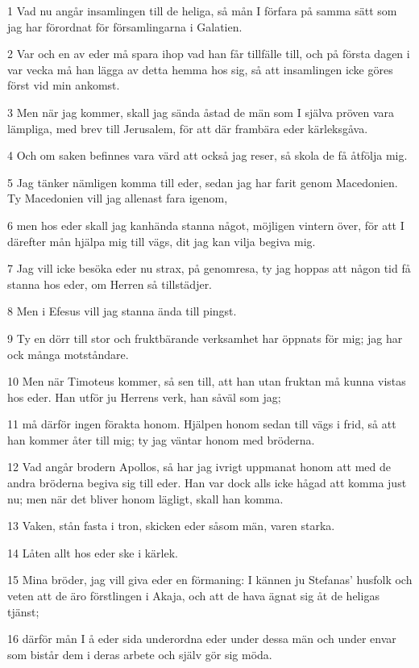 \par 1 Vad nu angår insamlingen till de heliga, så mån I förfara på samma sätt som jag har förordnat för församlingarna i Galatien.
\par 2 Var och en av eder må spara ihop vad han får tillfälle till, och på första dagen i var vecka må han lägga av detta hemma hos sig, så att insamlingen icke göres först vid min ankomst.
\par 3 Men när jag kommer, skall jag sända åstad de män som I själva pröven vara lämpliga, med brev till Jerusalem, för att där frambära eder kärleksgåva.
\par 4 Och om saken befinnes vara värd att också jag reser, så skola de få åtfölja mig.
\par 5 Jag tänker nämligen komma till eder, sedan jag har farit genom Macedonien. Ty Macedonien vill jag allenast fara igenom,
\par 6 men hos eder skall jag kanhända stanna något, möjligen vintern över, för att I därefter mån hjälpa mig till vägs, dit jag kan vilja begiva mig.
\par 7 Jag vill icke besöka eder nu strax, på genomresa, ty jag hoppas att någon tid få stanna hos eder, om Herren så tillstädjer.
\par 8 Men i Efesus vill jag stanna ända till pingst.
\par 9 Ty en dörr till stor och fruktbärande verksamhet har öppnats för mig; jag har ock många motståndare.
\par 10 Men när Timoteus kommer, så sen till, att han utan fruktan må kunna vistas hos eder. Han utför ju Herrens verk, han såväl som jag;
\par 11 må därför ingen förakta honom. Hjälpen honom sedan till vägs i frid, så att han kommer åter till mig; ty jag väntar honom med bröderna.
\par 12 Vad angår brodern Apollos, så har jag ivrigt uppmanat honom att med de andra bröderna begiva sig till eder. Han var dock alls icke hågad att komma just nu; men när det bliver honom lägligt, skall han komma.
\par 13 Vaken, stån fasta i tron, skicken eder såsom män, varen starka.
\par 14 Låten allt hos eder ske i kärlek.
\par 15 Mina bröder, jag vill giva eder en förmaning: I kännen ju Stefanas' husfolk och veten att de äro förstlingen i Akaja, och att de hava ägnat sig åt de heligas tjänst;
\par 16 därför mån I å eder sida underordna eder under dessa män och under envar som bistår dem i deras arbete och själv gör sig möda.
